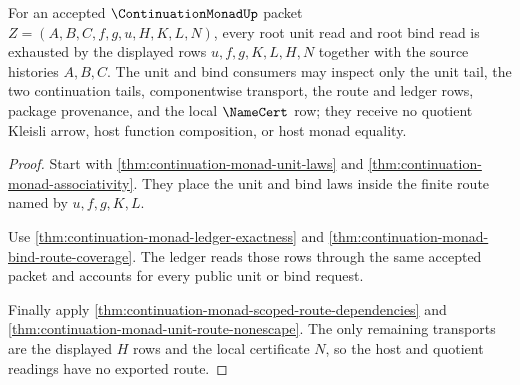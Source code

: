 \begin{theorem}
\label{thm:continuation-monad-root-unit-bind-exhaustion}
For an accepted $\ContinuationMonadUp$ packet $Z=(A,B,C,f,g,u,H,K,L,N)$, every root unit read and root bind read is exhausted by the displayed rows $u,f,g,K,L,H,N$ together with the source histories $A,B,C$. The unit and bind consumers may inspect only the unit tail, the two continuation tails, componentwise transport, the route and ledger rows, package provenance, and the local $\NameCert$ row; they receive no quotient Kleisli arrow, host function composition, or host monad equality.
\end{theorem}
\begin{proof}
Start with \autoref{thm:continuation-monad-unit-laws} and \autoref{thm:continuation-monad-associativity}. They place the unit and bind laws inside the finite route named by $u,f,g,K,L$.

Use \autoref{thm:continuation-monad-ledger-exactness} and \autoref{thm:continuation-monad-bind-route-coverage}. The ledger reads those rows through the same accepted packet and accounts for every public unit or bind request.

Finally apply \autoref{thm:continuation-monad-scoped-route-dependencies} and \autoref{thm:continuation-monad-unit-route-nonescape}. The only remaining transports are the displayed $H$ rows and the local certificate $N$, so the host and quotient readings have no exported route.
\end{proof}

